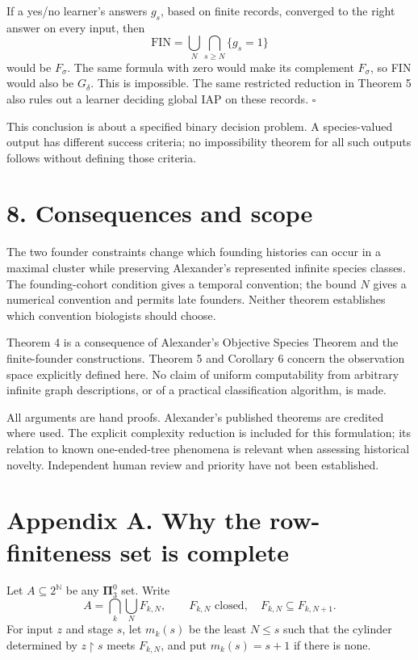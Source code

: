 \documentclass[
  11pt,
  letterpaper,
]{article}
\begin{document}
If a yes/no learner's answers \(g_s\), based on finite records,
converged to the right answer on every input, then \[
 \mathrm{FIN}=\bigcup_N\bigcap_{s\geq N}\{g_s=1\}
\] would be \(F_\sigma\). The same formula with zero would make its
complement \(F_\sigma\), so FIN would also be \(G_\delta\). This is
impossible. The same restricted reduction in Theorem 5 also rules out a
learner deciding global IAP on these records. \hfill\(\square\)

This conclusion is about a specified binary decision problem. A
species-valued output has different success criteria; no impossibility
theorem for all such outputs follows without defining those criteria.

\section{8. Consequences and scope}\label{consequences-and-scope}

The two founder constraints change which founding histories can occur in
a maximal cluster while preserving Alexander's represented infinite
species classes. The founding-cohort condition gives a temporal
convention; the bound \(N\) gives a numerical convention and permits
late founders. Neither theorem establishes which convention biologists
should choose.

Theorem 4 is a consequence of Alexander's Objective Species Theorem and
the finite-founder constructions. Theorem 5 and Corollary 6 concern the
observation space explicitly defined here. No claim of uniform
computability from arbitrary infinite graph descriptions, or of a
practical classification algorithm, is made.

All arguments are hand proofs. Alexander's published theorems are
credited where used. The explicit complexity reduction is included for
this formulation; its relation to known one-ended-tree phenomena is
relevant when assessing historical novelty. Independent human review and
priority have not been established.

\section{Appendix A. Why the row-finiteness set is
complete}\label{appendix-a.-why-the-row-finiteness-set-is-complete}

Let \(A\subseteq2^{\mathbb N}\) be any \(\boldsymbol{\Pi}^0_3\) set.
Write \[
 A=\bigcap_k\bigcup_N F_{k,N},
 \qquad F_{k,N}\text{ closed},\quad F_{k,N}\subseteq F_{k,N+1}.
\] For input \(z\) and stage \(s\), let \(m_k(s)\) be the least
\(N\leq s\) such that the cylinder determined by \(z\upharpoonright s\)
meets \(F_{k,N}\), and put \(m_k(s)=s+1\) if there is none.
\end{document}
